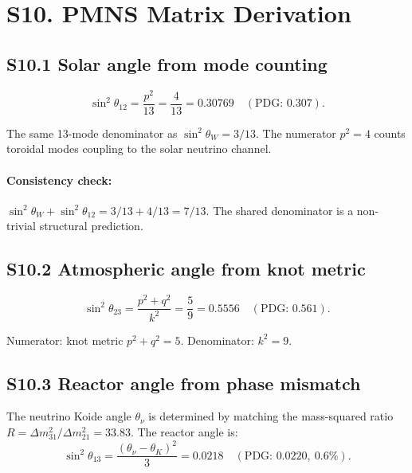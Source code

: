 \documentclass[11pt,a4paper]{article}
\begin{document}
\section{S10. PMNS Matrix Derivation}
\label{sec:S10}

\subsection{S10.1 Solar angle from mode counting}

\begin{equation}
  \sin^2\theta_{12} = \frac{p^2}{13} = \frac{4}{13} = 0.30769 \quad (\text{PDG: } 0.307).
\end{equation}

The same 13-mode denominator as $\sin^2\theta_W = 3/13$. The numerator $p^2 = 4$ counts toroidal modes coupling to the solar neutrino channel.

\paragraph{Consistency check:} $\sin^2\theta_W + \sin^2\theta_{12} = 3/13 + 4/13 = 7/13$. The shared denominator is a non-trivial structural prediction.

\subsection{S10.2 Atmospheric angle from knot metric}

\begin{equation}
  \sin^2\theta_{23} = \frac{p^2+q^2}{k^2} = \frac{5}{9} = 0.5556 \quad (\text{PDG: } 0.561).
\end{equation}

Numerator: knot metric $p^2+q^2 = 5$. Denominator: $k^2 = 9$.

\subsection{S10.3 Reactor angle from phase mismatch}

The neutrino Koide angle $\theta_\nu$ is determined by matching the mass-squared ratio $R = \Delta m^2_{31}/\Delta m^2_{21} = 33.83$. The reactor angle is:
\begin{equation}
  \sin^2\theta_{13} = \frac{(\theta_\nu - \theta_K)^2}{3} = 0.0218 \quad (\text{PDG: } 0.0220,\ 0.6\%).
\end{equation}
\end{document}
